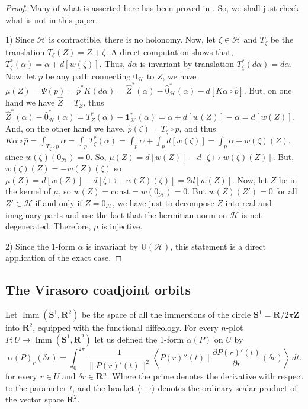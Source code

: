 \documentclass[10pt,reqno,twoside]{amsart}
\DeclareMathOperator{\Imm}{Imm}
\theoremstyle{plain}
\theoremstyle{definition}
\begin{document}
  \begin{proof}
    Many of what is asserted here has been proved in \cite{Piz06-a}.
    So,
    we shall just check what is not in this paper.
    
    1) Since $\mathcal{H}$ is contractible,
    there is no holonomy.
    Now,
    let $\zeta \in \mathcal{H}$ and $T_\zeta$ be the translation $T_\zeta(Z) = Z + \zeta$.
    A direct computation shows that,
    $T_\zeta^*(\alpha) = \alpha + d[w(\zeta)]$.
    Thus,
    $d\alpha$ is invariant by translation $T_\zeta^*(d\alpha) = d\alpha$.
    Now,
    let $p$ be any path connecting $0_\mathcal{H}$ to $Z$,
    we have $\mu(Z) = \Psi(p) = \hat p^*K(d\alpha) = \hat Z^*(\alpha) - \hat 0_\mathcal{H}^*(\alpha) - d[K\alpha \circ \hat p]$.
    But,
    on one hand we have $\hat Z = T_Z$,
    thus $\hat Z^*(\alpha) - \hat 0_\mathcal{H}^*(\alpha) = T_Z^*(\alpha) - \mathbf{1}_\mathcal{H}^*(\alpha) = \alpha + d[w(Z)] - \alpha = d[w(Z)]$.
    And,
    on the other hand we have,
    $\hat p (\zeta) = T_\zeta \circ p$,
    and thus $K\alpha \circ \hat p = \int_{T_\zeta \circ p} \alpha = \int_p T_\zeta^*(\alpha) = \int_p \alpha + \int_p d[w(\zeta)] = \int_p \alpha + w(\zeta)(Z)$,
    since $w(\zeta)(0_\mathcal{H}) = 0$.
    So,
    $\mu(Z) = d[w(Z)] - d[\zeta \mapsto w(\zeta)(Z)]$.
    But,
    $w(\zeta)(Z) = - w(Z)(\zeta)$ so $\mu(Z) = d[w(Z)] - d[\zeta \mapsto - w(Z)(\zeta)] = 2d[w(Z)]$.
    Now,
    let $Z$ be in the kernel of $\mu$,
    so $w(Z) = \mathrm{const} = w(0_\mathcal{H}) = 0$.
    But $w(Z)(Z') = 0$ for all $Z' \in \mathcal{H}$ if and only if $Z = 0_\mathcal{H}$,
    we have just to decompose $Z$ into real and imaginary parts and use the fact that the hermitian norm on $\mathcal{H}$ is not degenerated.
    Therefore,
    $\mu$ is injective.
    
    2) Since the 1-form $\alpha$ is invariant by $\mathrm{U}(\mathcal{H})$,
    this statement is a direct application of the exact case.
  \end{proof}
  
  
  \subsection{The Virasoro coadjoint orbits}
  \label{The-Virasoro-coadjoint-orbit}
  
  Let $\Imm(\mathbf{S}^1,\mathbf{R}^2)$ be the space of all the immersions of the circle $\mathbf{S}^1 = \mathbf{R}/2\pi\mathbf{Z}$ into $\mathbf{R}^2$,
  equipped with the functional diffeology.
  For every $n$-plot $P : U \to \Imm(\mathbf{S}^1,\mathbf{R}^2)$ let us defined the 1-form $\alpha(P)$ on $U$ by
  \[
  \alpha(P)_r(\delta r) = \int_0^{2\pi} \frac{1}{\lVert P(r)'(t)\rVert^2} \left\langle P(r)''(t) \mid \frac{\partial P(r)'(t)}{\partial r}(\delta r) \right\rangle \, dt.
  \]
  for every $r \in U$ and $\delta r \in \mathbf{R}^n$.
  Where the prime denotes the derivative with respect to the parameter $t$,
  and the bracket $\langle \cdot \mid \cdot \rangle$ denotes the ordinary scalar product of the vector space $\mathbf{R}^2$.
  
\end{document}
